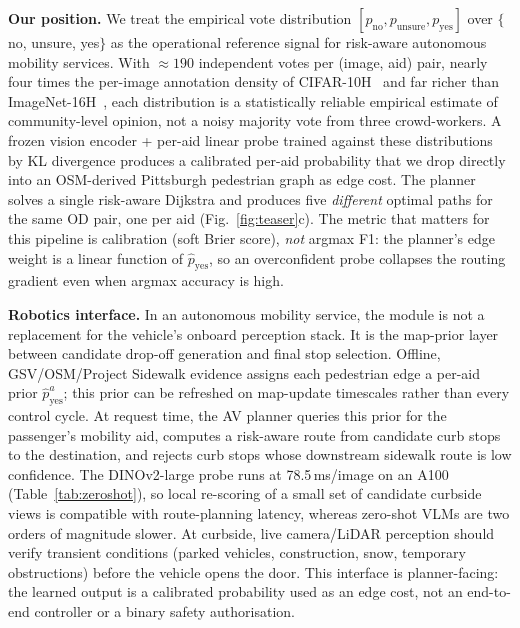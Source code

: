 \documentclass[conference]{IEEEtran}
\begin{document}
\textbf{Our position.} We treat the empirical vote distribution $[p_{\mathrm{no}}, p_{\mathrm{unsure}}, p_{\mathrm{yes}}]$ over $\{$no, unsure, yes$\}$ as the operational reference signal for risk-aware autonomous mobility services. With $\approx 190$ independent votes per (image, aid) pair, nearly four times the per-image annotation density of CIFAR-10H~\cite{peterson2019humanuncertainty} and far richer than ImageNet-16H~\cite{steyvers2022bayesian}, each distribution is a statistically reliable empirical estimate of community-level opinion, not a noisy majority vote from three crowd-workers. A frozen vision encoder + per-aid linear probe trained against these distributions by KL divergence produces a calibrated per-aid probability that we drop directly into an OSM-derived Pittsburgh pedestrian graph as edge cost. The planner solves a single risk-aware Dijkstra and produces five \emph{different} optimal paths for the same OD pair, one per aid (Fig.~\ref{fig:teaser}c). The metric that matters for this pipeline is calibration (soft Brier score), \emph{not} argmax F1: the planner's edge weight is a linear function of $\hat{p}_\mathrm{yes}$, so an overconfident probe collapses the routing gradient even when argmax accuracy is high.

\textbf{Robotics interface.} In an autonomous mobility service, the module is not a replacement for the vehicle's onboard perception stack. It is the map-prior layer between candidate drop-off generation and final stop selection. Offline, GSV/OSM/Project Sidewalk evidence assigns each pedestrian edge a per-aid prior $\hat{p}^a_{\mathrm{yes}}$; this prior can be refreshed on map-update timescales rather than every control cycle. At request time, the AV planner queries this prior for the passenger's mobility aid, computes a risk-aware route from candidate curb stops to the destination, and rejects curb stops whose downstream sidewalk route is low confidence. The DINOv2-large probe runs at 78.5\,ms/image on an A100 (Table~\ref{tab:zeroshot}), so local re-scoring of a small set of candidate curbside views is compatible with route-planning latency, whereas zero-shot VLMs are two orders of magnitude slower. At curbside, live camera/LiDAR perception should verify transient conditions (parked vehicles, construction, snow, temporary obstructions) before the vehicle opens the door. This interface is planner-facing: the learned output is a calibrated probability used as an edge cost, not an end-to-end controller or a binary safety authorisation.
\end{document}
